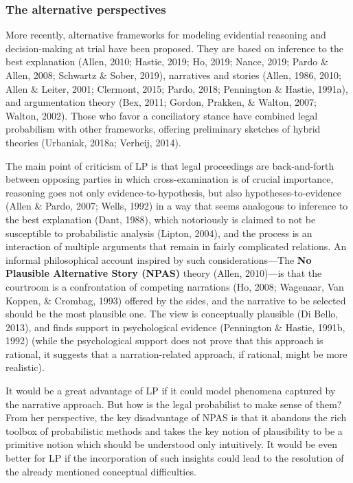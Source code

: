 \documentclass[11pt,dvipsnames,enabledeprecatedfontcommands]{scrartcl}
\begin{document}
\subsubsection{The alternative
perspectives}\label{the-alternative-perspectives}

More recently, alternative frameworks for modeling evidential reasoning
and decision-making at trial have been proposed. They are based on
inference to the best explanation (Allen, 2010; Hastie, 2019; Ho, 2019;
Nance, 2019; Pardo \& Allen, 2008; Schwartz \& Sober, 2019), narratives
and stories (Allen, 1986, 2010; Allen \& Leiter, 2001; Clermont, 2015;
Pardo, 2018; Pennington \& Hastie, 1991a), and argumentation theory
(Bex, 2011; Gordon, Prakken, \& Walton, 2007; Walton, 2002). Those who
favor a conciliatory stance have combined legal probabilism with other
frameworks, offering preliminary sketches of hybrid theories (Urbaniak,
2018a; Verheij, 2014).

The main point of criticism of LP is that legal proceedings are
back-and-forth between opposing parties in which cross-examination is of
crucial importance, reasoning goes not only evidence-to-hypothesis, but
also hypotheses-to-evidence (Allen \& Pardo, 2007; Wells, 1992) in a way
that seems analogous to inference to the best explanation (Dant, 1988),
which notoriously is claimed to not be susceptible to probabilistic
analysis (Lipton, 2004), and the process is an interaction of multiple
arguments that remain in fairly complicated relations. An informal
philosophical account inspired by such considerations---The
\textbf{No Plausible Alternative Story (NPAS)} theory (Allen, 2010)---is
that the courtroom is a confrontation of competing narrations (Ho, 2008;
Wagenaar, Van Koppen, \& Crombag, 1993) offered by the sides, and the
narrative to be selected should be the most plausible one. The view is
conceptually plausible (Di Bello, 2013), and finds support in
psychological evidence (Pennington \& Hastie, 1991b, 1992) (while the
psychological support does not prove that this approach is rational, it
suggests that a narration-related approach, if rational, might be more
realistic).

It would be a great advantage of LP if it could model phenomena captured
by the narrative approach. But how is the legal probabilist to make
sense of them? From her perspective, the key disadvantage of NPAS is
that it abandons the rich toolbox of probabilistic methods and takes the
key notion of plausibility to be a primitive notion which should be
understood only intuitively. It would be even better for LP if the
incorporation of such insights could lead to the resolution of the
already mentioned conceptual difficulties.
\end{document}
